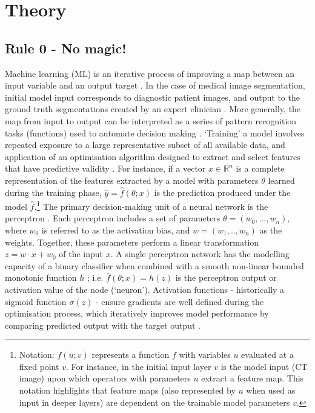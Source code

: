 \chapter{Theory}
\label{ch:theory}

\section{Rule 0 - No magic!}
\label{NoMagic}
Machine learning (ML) is an iterative process of improving a map between an input variable and an output target \cite{Maier2019}. In the case of medical image segmentation, initial model input corresponds to diagnostic patient images, and output to the ground truth segmentations created by an expert clinician \cite{Kazemifar_2018}. More generally, the map from input to output can be interpreted as a series of pattern recognition tasks (functions) used to automate decision making \cite{Maier2019}. `Training' a model involves repeated exposure to a large representative subset of all available data, and application of an optimisation algorithm designed to extract and select features that have predictive validity \cite{Maier2019}. For instance, if a vector $x\in\mathbb{R}^{n}$ is a complete representation of the features extracted by a model with parameters $\theta$ learned during the training phase, $\hat{y} = \hat{f}(\theta; x)$ is the prediction produced under the model $\hat{f}$.\footnote{Notation: $f(u; v)$ represents a function $f$ with variables $u$ evaluated at a fixed point $v$. For instance, in the initial input layer $v$ is the model input (CT image) upon which operators with parameters $u$ extract a feature map. This notation highlights that feature maps (also represented by $u$ when used as input in deeper layers) are dependent on the trainable model parameters $v$.} The primary decision-making unit of a neural network is the perceptron \cite{Maier2019}. Each perceptron includes a set of parameters $\theta = (w_{0}, ...,w_{n} )$, where $w_{0}$ is referred to as the activation bias, and $w = (w_{1},..,w_{n})$ as the weights. Together, these parameters perform a linear transformation $z = w \cdot x + w_{0}$ of the input $x$. A single perceptron network has the modelling capacity of a binary classifier when combined with a smooth non-linear bounded monotonic function $h$ \cite{Maier2019}; i.e. $\hat{f}(\theta; x) = h(z)$ is the perceptron output or activation value of the node (`neuron'). Activation functions - historically a sigmoid function $\sigma(z)$ - ensure gradients are well defined during the optimisation process, which iteratively improves model performance by comparing predicted output with the target output \cite{Maier2019}.

